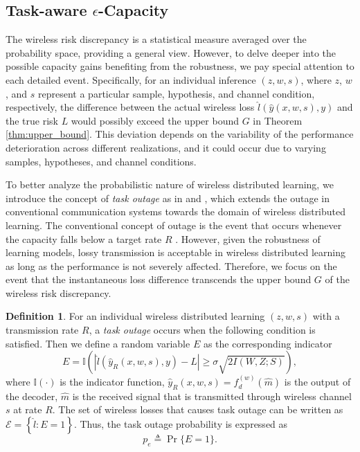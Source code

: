 \documentclass[lettersize,journal]{IEEEtran}
\theoremstyle{definition}
\newtheorem{definition}{Definition}
\theoremstyle{plain}
\begin{document}

\subsection{Task-aware $\epsilon$-Capacity} 
The wireless risk discrepancy is a statistical measure averaged over the probability space, providing a general view. However, to delve deeper into the possible capacity gains benefiting from the robustness, we pay special attention to each detailed event.
Specifically, for an individual inference $(z,w,s)$, where $z$, $w$, and $s$ represent a particular sample, hypothesis, and channel condition, respectively, the difference between the actual wireless loss $\hat{l}(\hat{y}(x,w,s),y)$ and the true risk $L$ would possibly exceed the upper bound $G$ in Theorem \ref{thm:upper_bound}.
This deviation depends on the variability of the performance deterioration across different realizations, and it could occur due to varying samples, hypotheses, and channel conditions. 

To better analyze the probabilistic nature of wireless distributed learning, we introduce the concept of \textit{task outage} as in \cite{outage-scan} and \cite{outage-semantic-text}, which extends the outage in conventional communication systems towards the domain of wireless distributed learning. 
The conventional concept of outage is the event that occurs whenever the capacity falls below a target rate $R$ \cite{fundamental-wireless-communication}. 
However, given the robustness of learning models, lossy transmission is acceptable in wireless distributed learning as long as the performance is not severely affected. Therefore, we focus on the event that the instantaneous loss difference transcends the upper bound $G$ of the wireless risk discrepancy.
\begin{definition}%
    \label{thm:outage}
    For an individual wireless distributed learning $(z,w,s)$ with a transmission rate $R$, a \textit{task outage} occurs when the following condition is satisfied. Then we define a random variable $E$ as the corresponding indicator
    \begin{equation}
        \label{equ:task_error}
        E=\mathbb{I}\left(\left| \hat{l}(\hat{y}_R(x,w,s),y) - L\right| \geq \sigma\sqrt{2I(W,Z;S)}\right),
    \end{equation}
    where $\mathbb{I}(\cdot)$ is the indicator function, $\hat{y}_R(x,w,s) = f_d^{(w)}(\hat{m})$ is the output of the decoder, $\hat{m}$ is the received signal that is transmitted through wireless channel $s$ at rate $R$. 
    The set of wireless losses that causes task outage can be written as $\mathcal{E}=\left\{\hat{l}: E = 1 \right\}$.
    Thus, the task outage probability is expressed as 
    \begin{equation}
        \label{equ:outage_probability}
        p_e\triangleq \Pr\{E=1\}.
    \end{equation}
\end{definition}
\end{document}
